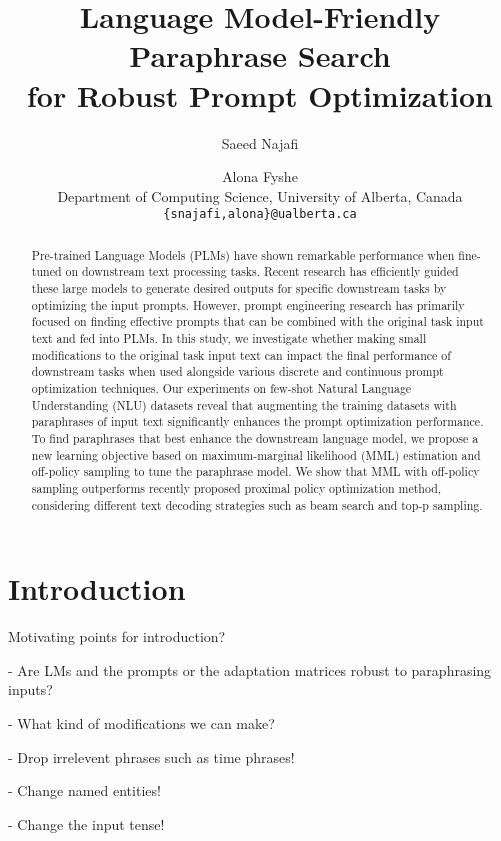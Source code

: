\documentclass[11pt]{article}
\title{Language Model-Friendly Paraphrase Search \\
for Robust Prompt Optimization}
\author{Saeed Najafi \and
  Alona Fyshe \\
  Department of Computing Science, University of Alberta, Canada\\
  \texttt{\{snajafi,alona\}@ualberta.ca} \\}
\begin{document}
\maketitle
\begin{abstract}
Pre-trained Language Models (PLMs) have shown remarkable performance when fine-tuned on downstream text processing tasks. Recent research has efficiently guided these large models to generate desired outputs for specific downstream tasks by optimizing the input prompts. However, prompt engineering research has primarily focused on finding effective prompts that can be combined with the original task input text and fed into PLMs. In this study, we investigate whether making small modifications to the original task input text can impact the final performance of downstream tasks when used alongside various discrete and continuous prompt optimization techniques. Our experiments on few-shot Natural Language Understanding (NLU) datasets reveal that augmenting the training datasets with paraphrases of input text significantly enhances the prompt optimization performance. To find paraphrases that best enhance the downstream language model, we propose a new learning objective based on maximum-marginal likelihood (MML) estimation and off-policy sampling to tune the paraphrase model. We show that MML with off-policy sampling outperforms recently proposed proximal policy optimization method, considering different text decoding strategies such as beam search and top-p sampling.
\end{abstract}


\section{Introduction}
Motivating points for introduction?

- Are LMs and the prompts or the adaptation matrices robust to paraphrasing inputs?

- What kind of modifications we can make?

- Drop irrelevent phrases such as time phrases!

- Change named entities!

- Change the input tense!
\end{document}
